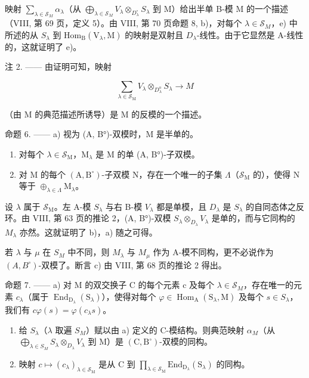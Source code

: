 映射 \(\sum_{\lambda\in\mathcal{S}_{M}}\alpha_{\lambda}\)（从 \(\bigoplus_{\lambda\in\mathcal{S}_{M}}V_{\lambda}\otimes_{D_{\lambda}^{\circ}}S_{\lambda}\) 到 M）给出半单 B-模 M 的一个描述（VIII, 第 69 页，定义 5）。由 VIII, 第 70 页命题 8, b)，对每个 \(\lambda\in\mathcal{S}_{M}\)，e) 中所述的从 \(S_{\lambda}\) 到 \(\mathrm{Hom}_{\mathrm{B}}(\mathrm{V}_{\lambda},\mathrm{M})\) 的映射是双射且 \(D_{\lambda}\)-线性。由于它显然是 A-线性的，这就证明了 e)。

注 2. —— 由证明可知，映射

\[
\sum_ {\lambda \in \mathcal {S} _ {\mathrm{M}}} V _ {\lambda} \otimes_ {D _ {\lambda} ^ {\mathrm{o}}} S _ {\lambda} \longrightarrow M
\]

（由 M 的典范描述所诱导）是 M 的反模的一个描述。

命题 6. —— a) 视为 (A, B°)-双模时，M 是半单的。

\begin{enumerate}
\def\labelenumi{\alph{enumi})}
\setcounter{enumi}{1}
\item
  对每个 \(\lambda \in \mathcal{S}_{\mathrm{M}}\)，\(\mathrm{M}_{\lambda}\) 是 M 的单 (A, B°)-子双模。
\item
  对 M 的每个 \((\mathrm{A},\mathrm{B}^{\circ})\)-子双模 N，存在一个唯一的子集 \(\Lambda\)（\(\mathcal{S}_{\mathrm{M}}\) 的），使得 N 等于 \(\oplus_{\lambda \in \Lambda}\mathrm{M}_{\lambda}\)。
\end{enumerate}

设 \(\lambda\) 属于 \(\mathcal{S}_{\mathrm{M}}\)。左 A-模 \(S_{\lambda}\) 与右 B-模 \(V_{\lambda}\) 都是单模，且 \(D_{\lambda}\) 是 \(S_{\lambda}\) 的自同态体之反环。由 VIII, 第 63 页的推论 2，(A, B°)-双模 \(S_{\lambda} \otimes_{D_{\lambda}} V_{\lambda}\) 是单的，而与它同构的 \(M_{\lambda}\) 亦然。这就证明了 b)，a) 随之可得。

若 \(\lambda\) 与 \(\mu\) 在 \(S_{M}\) 中不同，则 \(M_{\lambda}\) 与 \(M_{\mu}\) 作为 A-模不同构，更不必说作为 \((A,B^{\circ})\)-双模了。断言 c) 由 VIII, 第 68 页的推论 2 得出。

命题 7. —— a) 对 M 的双交换子 C 的每个元素 c 及每个 \(\lambda\in\mathcal{S}_{M}\)，存在唯一的元素 \(c_{\lambda}\)（属于 \(\operatorname{End}_{\mathrm{D}_{\lambda}}(\mathrm{S}_{\lambda})\)），使得对每个 \(\varphi\in\operatorname{Hom}_{\mathrm{A}}(\mathrm{S}_{\lambda},\mathrm{M})\) 及每个 \(s\in S_{\lambda}\)，我们有 \(c\varphi(s)=\varphi(c_{\lambda}s)\)。

\begin{enumerate}
\def\labelenumi{\alph{enumi})}
\setcounter{enumi}{1}
\item
  给 \(S_{\lambda}\)（\(\lambda\) 取遍 \(S_{M}\)）赋以由 a) 定义的 C-模结构。则典范映射 \(\alpha_{M}\)（从 \(\bigoplus_{\lambda\in S_{M}}S_{\lambda}\otimes_{D_{\lambda}}V_{\lambda}\) 到 M）是 \((\mathrm{C},\mathrm{B}^{\circ})\)-双模的同构。
\item
  映射 \(c \mapsto (c_{\lambda})_{\lambda \in \mathcal{S}_{\mathrm{M}}}\) 是从 C 到 \(\prod_{\lambda \in \mathcal{S}_{\mathrm{M}}}\mathrm{End}_{\mathrm{D}_{\lambda}}(\mathrm{S}_{\lambda})\) 的同构。
\end{enumerate}

